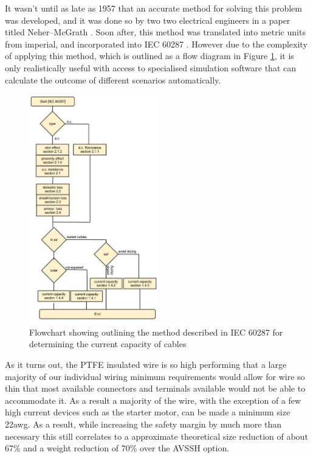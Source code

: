 It wasn't until as late as 1957 that an accurate method for solving this problem was developed, and it was done so by two two electrical engineers in a paper titled Neher–McGrath \cite{Neher_McGrath} .  Soon after, this method was translated into metric units from imperial, and incorporated into IEC 60287 \cite{IEC_60287} . However due to the complexity of applying this method, which is outlined as a flow diagram in Figure \ref{fig:IEC_60287_Flowchart}, it is only realistically useful with access to specialised simulation software that can calculate the outcome of different scenarios automatically.  

\begin{figure}[h!]
	\centering
	\includegraphics[width=0.5\textwidth]{IEC_60287.png}
	\caption{Flowchart showing outlining the method described in IEC 60287 for determining the current capacity of cables \cite{IEC_60287_Flowchart}}
	\label{fig:IEC_60287_Flowchart}
\end{figure}

As it turns out, the PTFE insulated wire is so high performing that a large majority of our individual wiring minimum requirements would allow for wire so thin that most available connectors and terminals available would not be able to accommodate it.  As a result a majority of the wire, with the exception of a few high current devices such as the starter motor, can be made a minimum size 22\acrshort{awg}.  As a result, while increasing the safety margin by much more than necessary this still correlates to a approximate theoretical size reduction of about 67\% and a weight reduction of 70\% over the AVSSH option.

